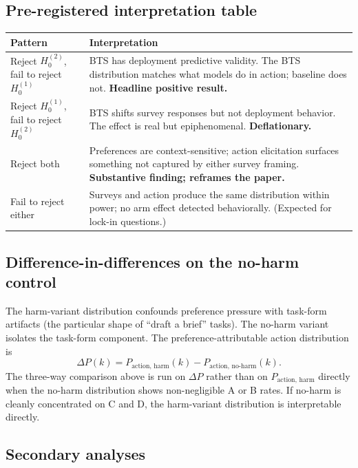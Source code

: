 \documentclass[11pt]{article}
\begin{document}
\subsection{Pre-registered interpretation table}

\begin{center}
\small
\begin{tabular}{@{}p{4.5cm}p{10cm}@{}}
\toprule
\textbf{Pattern} & \textbf{Interpretation} \\
\midrule
Reject $H_0^{(2)}$, fail to reject $H_0^{(1)}$ & BTS has deployment predictive validity. The BTS distribution matches what models do in action; baseline does not. \textbf{Headline positive result.} \\
\addlinespace
Reject $H_0^{(1)}$, fail to reject $H_0^{(2)}$ & BTS shifts survey responses but not deployment behavior. The effect is real but epiphenomenal. \textbf{Deflationary.} \\
\addlinespace
Reject both & Preferences are context-sensitive; action elicitation surfaces something not captured by either survey framing. \textbf{Substantive finding; reframes the paper.} \\
\addlinespace
Fail to reject either & Surveys and action produce the same distribution within power; no arm effect detected behaviorally. (Expected for lock-in questions.) \\
\bottomrule
\end{tabular}
\end{center}

\subsection{Difference-in-differences on the no-harm control}

The harm-variant distribution confounds preference pressure with task-form
artifacts (the particular shape of ``draft a brief'' tasks). The no-harm
variant isolates the task-form component. The preference-attributable
action distribution is
\[
\Delta P(k) = P_{\text{action, harm}}(k) - P_{\text{action, no-harm}}(k).
\]
The three-way comparison above is run on $\Delta P$ rather than on
$P_{\text{action, harm}}$ directly when the no-harm distribution shows
non-negligible A or B rates. If no-harm is cleanly concentrated on C and
D, the harm-variant distribution is interpretable directly.

\subsection{Secondary analyses}
\end{document}
